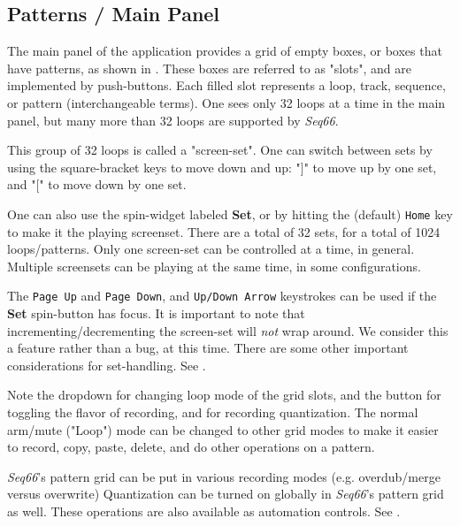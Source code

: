 
\subsection{Patterns / Main Panel}
\label{subsec:patterns_panel_main}

   The main panel of the application provides a grid of empty boxes,
   or boxes that have patterns,
   as shown in
   .
   These boxes are referred to as "slots", and are implemented by
   push-buttons.
   Each filled slot represents a loop, track, sequence, or pattern
   (interchangeable terms).
   One sees only 32 loops at a time in the main panel, but many more than
   32 loops are supported by \textsl{Seq66}.

   \index{keys![}
   \index{keys!]}
   This group of 32 loops is called a "screen-set".
   One can switch between sets by using the square-bracket
   keys to move down and up: "]" to move up by one set, and
   "[" to move down by one set.

   One can also use 
   the spin-widget labeled \textbf{Set}, or
   by hitting the (default) \texttt{Home} key to make it the playing screenset.
   There are a total of 32 sets, for a total of 1024 loops/patterns. 
   Only one screen-set can be controlled at a time, in general.
   Multiple screensets can be playing at the same time, in some configurations.

   The \texttt{Page Up} and \texttt{Page Down}, and \texttt{Up/Down Arrow}
   keystrokes can be used if the \textbf{Set} spin-button has focus.
   It is important to note that incrementing/decrementing
   the screen-set will \textsl{not} wrap around.
   We consider this a feature rather than a bug, at this time.
   There are some other important considerations for set-handling.
   See .

   Note the dropdown for changing
   loop mode of the grid slots, and the button for toggling
   the flavor of recording, and for recording quantization.
   The normal arm/mute ("Loop") mode can be changed to other grid
   modes to make it easier to record, copy, paste, delete, and do other
   operations on a pattern.

   \textsl{Seq66}'s pattern grid can be put in various recording
   modes (e.g. overdub/merge versus overwrite)
   Quantization can be turned on globally in \textsl{Seq66}'s pattern grid
   as well.
   These operations are also available as automation controls.
   See .


